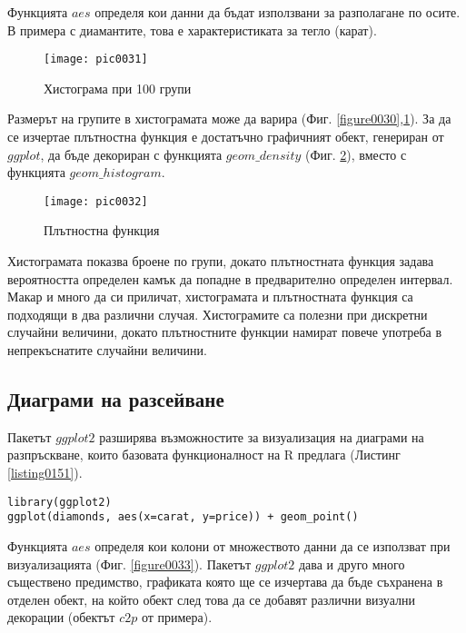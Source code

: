 Функцията $aes$ определя кои данни да бъдат използвани за разполагане по осите. В примера с диамантите, това е характеристиката за тегло (карат). 

\begin{figure}[h!]
  \centering
  \texttt{[image: pic0031]}
  \caption{Хистограма при 100 групи}
\label{figure0031}
\end{figure}
\FloatBarrier

Размерът на групите в хистограмата може да варира (Фиг. \ref{figure0030},\ref{figure0031}). За да се изчертае плътностна функция е достатъчно графичният обект, генериран от $ggplot$, да бъде декориран с функцията $geom\_density$ (Фиг. \ref{figure0032}), вместо с функцията $geom\_histogram$. 


\begin{figure}[h!]
  \centering
  \texttt{[image: pic0032]}
  \caption{Плътностна функция}
\label{figure0032}
\end{figure}
\FloatBarrier

Хистограмата показва броене по групи, докато плътностната функция задава вероятността определен камък да попадне в предварително определен интервал. Макар и много да си приличат, хистограмата и плътностната функция са подходящи в два различни случая. Хистограмите са полезни при дискретни случайни величини, докато плътностните функции намират повече употреба в непрекъснатите случайни величини. 

\subsection{Диаграми на разсейване}

Пакетът $ggplot2$ разширява възможностите за визуализация на диаграми на разпръскване, които базовата функционалност на R предлага (Листинг \ref{listing0151}). 

\begin{lstlisting}[caption=Диаграма на разсейване с ggplot2, label=listing0151]
library(ggplot2)
ggplot(diamonds, aes(x=carat, y=price)) + geom_point()
\end{lstlisting}

Функцията $aes$ определя кои колони от множеството данни да се използват при визуализацията (Фиг. \ref{figure0033}). Пакетът $ggplot2$ дава и друго много съществено предимство, графиката която ще се изчертава да бъде съхранена в отделен обект, на който обект след това да се добавят различни визуални декорации (обектът $c2p$ от примера).


